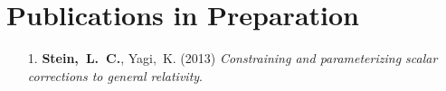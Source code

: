 \section{\sc Publications in Preparation}
\begin{enumerate}
\item[{1.}] {\bf Stein,~L.~C.}, Yagi,~K. (2013)
  {\it Constraining and parameterizing scalar corrections to general relativity}.
\end{enumerate}


